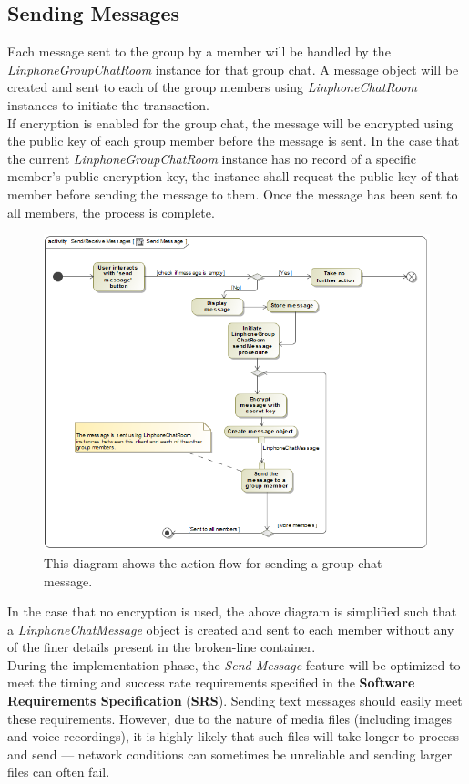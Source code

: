 \documentclass[11pt]{article}
\begin{document}
\subsection{Sending Messages}
Each message sent to the group by a member will be handled by the \textit{LinphoneGroupChatRoom} instance for that group chat. A message object will be created and sent to each of the group members using \textit{LinphoneChatRoom} instances to initiate the transaction.\\
If encryption is enabled for the group chat, the message will be encrypted using the public key of each group member before the message is sent. In the case that the current \textit{LinphoneGroupChatRoom} instance has no record of a specific member's public encryption key, the instance shall request the public key of that member before sending the message to them. Once the message has been sent to all members, the process is complete.
\begin{figure}[H]
\centering
\includegraphics[width=5in]{./images/activity_send_message.png}
\caption[Send Message Activity Diagram]{This diagram shows the action flow for sending a group chat message.}
\label{ad-send-message}
\end{figure}
In the case that no encryption is used, the above diagram is simplified such that a \textit{LinphoneChatMessage} object is created and sent to each member without any of the finer details present in the broken-line container.\\

During the implementation phase, the \textit{Send Message} feature will be optimized to meet the timing and success rate requirements specified in the \textbf{Software Requirements Specification} (\textbf{SRS}). Sending text messages should easily meet these requirements. However, due to the nature of media files (including images and voice recordings), it is highly likely that such files will take longer to process and send --- network conditions can sometimes be unreliable and sending larger files can often fail.
\end{document}
